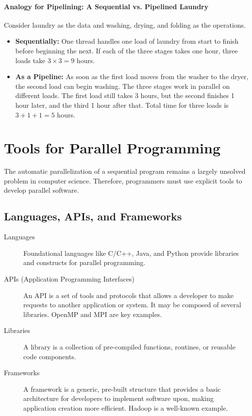 \paragraph{Analogy for Pipelining: A Sequential vs. Pipelined Laundry}
Consider laundry as the data and washing, drying, and folding as the operations.
\begin{itemize}
    \item \textbf{Sequentially:} One thread handles one load of laundry from start to finish before beginning the next. If each of the three stages takes one hour, three loads take $3 \times 3 = 9$ hours.
    \item \textbf{As a Pipeline:} As soon as the first load moves from the washer to the dryer, the second load can begin washing. The three stages work in parallel on different loads. The first load still takes 3 hours, but the second finishes 1 hour later, and the third 1 hour after that. Total time for three loads is $3+1+1=5$ hours.
\end{itemize}

\section{Tools for Parallel Programming}
\label{sec:parallel_programming_tools}
The automatic parallelization of a sequential program remains a largely unsolved problem in computer science. Therefore, programmers must use explicit tools to develop parallel software.

\subsection{Languages, APIs, and Frameworks}
\begin{description}
    \item[Languages] Foundational languages like C/C++, Java, and Python provide libraries and constructs for parallel programming.
    \item[APIs (Application Programming Interfaces)] An API is a set of tools and protocols that allows a developer to make requests to another application or system. It may be composed of several libraries. OpenMP and MPI are key examples.
    \item[Libraries] A library is a collection of pre-compiled functions, routines, or reusable code components.
    \item[Frameworks] A framework is a generic, pre-built structure that provides a basic architecture for developers to implement software upon, making application creation more efficient. Hadoop is a well-known example.
\end{description}


